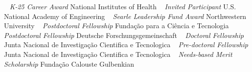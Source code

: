 ~
\Gap
{}
\textit{K-25 Career Award}
\newline
National Institutes of Health
\newline
~
\Gap
{}
\textit{Invited Participant}
\newline
U.S. National Academy of Engineering
\newline
~
\Gap
{}
\textit{Searle Leadership Fund Award}
\newline
Northwestern University
\newline
~
\Gap
{}
\textit{Postdoctoral Fellowship}
\newline
Funda\c{c}\~ao para a Ci\^encia e Tecnologia
\newline
~
\Gap
{}
\textit{Postdoctoral Fellowship}
\newline
Deutsche Forschungsgemeinschaft 
\newline
~
\Gap
{}
\textit{Doctoral Fellowship}
\newline
Junta Nacional de Investiga\c{c}\~ao Cientifica e Tecnologica 
\newline
~
\Gap
{}
\textit{Pre-doctoral Fellowship}
\newline
Junta Nacional de Investiga\c{c}\~ao Cientifica e Tecnologica 
\newline
~
\Gap
{}
\textit{Needs-based Merit Scholarship}
\newline
Funda\c{c}\~ao Calouste Gulbenkian
\newline
~
\Gap
\vspace*{0.2cm}